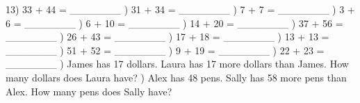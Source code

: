 \documentclass{article}%
\begin{document}
13) 33 + 44 = \_\_\_\_\_\_\_%
\newline%
\newline%
) 31 + 34 = \_\_\_\_\_\_\_%
\newline%
\newline%
) 7 + 7 = \_\_\_\_\_\_\_%
\newline%
\newline%
) 3 + 6 = \_\_\_\_\_\_\_%
\newline%
\newline%
) 6 + 10 = \_\_\_\_\_\_\_%
\newline%
\newline%
) 14 + 20 = \_\_\_\_\_\_\_%
\newline%
\newline%
) 37 + 56 = \_\_\_\_\_\_\_%
\newline%
\newline%
) 26 + 43 = \_\_\_\_\_\_\_%
\newline%
\newline%
) 17 + 18 = \_\_\_\_\_\_\_%
\newline%
\newline%
) 13 + 13 = \_\_\_\_\_\_\_%
\newline%
\newline%
) 51 + 52 = \_\_\_\_\_\_\_%
\newline%
\newline%
) 9 + 19 = \_\_\_\_\_\_\_%
\newline%
\newline%
) 22 + 23 = \_\_\_\_\_\_\_%
\newline%
\newline%
) James has 17 dollars. Laura has 17 more dollars than James. How many dollars does Laura have?%
\newline%
\newline%
) Alex has 48 pens. Sally has 58 more pens than Alex. How many pens does Sally have?%
\end{document}
